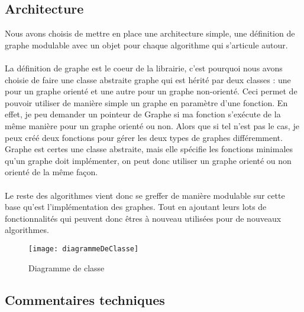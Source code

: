 \begin{titlepage}
\newpage
\begin{center}
\begin{bf}
\section{Architecture}
\end{bf}
\end{center}

\vspace{1cm}
{
Nous avons choisis de mettre en place une architecture simple, une définition de graphe modulable avec un objet pour chaque algorithme qui s'articule autour.
\\ \\
La définition de graphe est le coeur de la librairie, c'est pourquoi nous avons choisie de faire une classe abstraite graphe qui est hérité par deux classes : une pour un graphe orienté et une autre pour un graphe non-orienté. Ceci permet de pouvoir utiliser de manière simple un graphe en paramètre d'une fonction. En effet, je peu demander un pointeur de Graphe si ma fonction s'exécute de la même manière pour un graphe orienté ou non. Alors que si tel n'est pas le cas, je peux créé deux fonctions pour gérer les deux types de graphes différemment. Graphe est certes une classe abstraite, mais elle spécifie les fonctions minimales qu'un graphe doit implémenter, on peut donc utiliser un graphe orienté ou non orienté de la même façon.
\\ \\
Le reste des algorithmes vient donc se greffer de manière modulable sur cette base qu'est l'implémentation des graphes. Tout en ajoutant leurs lots de fonctionnalités qui peuvent donc êtres à nouveau utilisées pour de nouveaux algorithmes.
}



\newpage
{
\begin{figure}[!h]
\centering
\texttt{[image: diagrammeDeClasse]}
\caption{Diagramme de classe}
\end{figure}
}



\newpage
\begin{center}
\begin{bf}
\section{Commentaires techniques}
\end{bf}
\end{center}


\end{titlepage}
